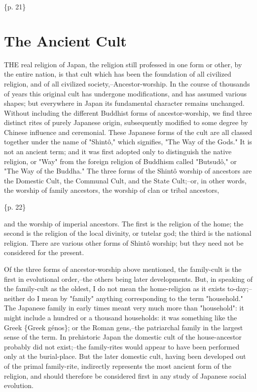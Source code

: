 \{p. 21\}

\section{The Ancient Cult}
\label{sec:org2ec5a04}

THE real religion of Japan, the religion still professed in one form or other, by the entire nation, is that cult which has been the foundation of all civilized religion, and of all civilized society,--Ancestor-worship. In the course of thousands of years this original cult has undergone modifications, and has assumed various shapes; but everywhere in Japan its fundamental character remains unchanged. Without including the different Buddhist forms of ancestor-worship, we find three distinct rites of purely Japanese origin, subsequently modified to some degree by Chinese influence and ceremonial. These Japanese forms of the cult are all classed together under the name of "Shintô," which signifies, "The Way of the Gods." It is not an ancient term; and it was first adopted only to distinguish the native religion, or "Way" from the foreign religion of Buddhism called "Butsudô," or "The Way of the Buddha." The three forms of the Shintô worship of ancestors are the Domestic Cult, the Communal Cult, and the State Cult;--or, in other words, the worship of family ancestors, the worship of clan or tribal ancestors,

\{p. 22\}

and the worship of imperial ancestors. The first is the religion of the home; the second is the religion of the local divinity, or tutelar god; the third is the national religion. There are various other forms of Shintô worship; but they need not be considered for the present.

Of the three forms of ancestor-worship above mentioned, the family-cult is the first in evolutional order,--the others being later developments. But, in speaking of the family-cult as the oldest, I do not mean the home-religion as it exists to-day;--neither do I mean by "family" anything corresponding to the term "household." The Japanese family in early times meant very much more than "household": it might include a hundred or a thousand households: it was something like the Greek \{Greek génos\}; or the Roman gens,--the patriarchal family in the largest sense of the term. In prehistoric Japan the domestic cult of the house-ancestor probably did not exist;--the family-rites would appear to have been performed only at the burial-place. But the later domestic cult, having been developed out of the primal family-rite, indirectly represents the most ancient form of the religion, and should therefore be considered first in any study of Japanese social evolution.

